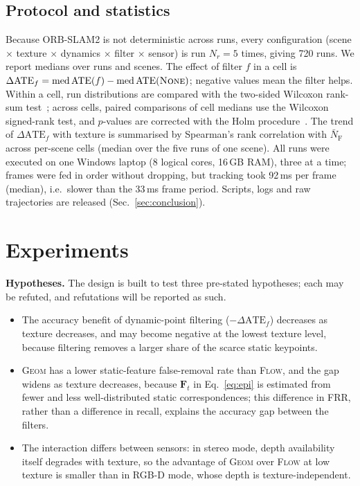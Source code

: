 \documentclass[conference]{IEEEtran}
\newcommand{\none}{\textsc{None}}
\newcommand{\flow}{\textsc{Flow}}
\newcommand{\geom}{\textsc{Geom}}
\newcommand{\hyp}[1]{\textbf{H#1}}
\newcommand{\NFAST}{\bar{N}_{\mathrm{F}}}
\begin{document}
\subsection{Protocol and statistics}
\label{sec:protocol}
Because ORB-SLAM2 is not deterministic across runs, every configuration (scene $\times$ texture $\times$ dynamics $\times$ filter $\times$ sensor) is run $N_r=5$ times, giving 720 runs. We report medians over runs and scenes. The effect of filter $f$ in a cell is $\Delta\mathrm{ATE}_f=\mathrm{med}\,\mathrm{ATE}(f)-\mathrm{med}\,\mathrm{ATE}(\none)$; negative values mean the filter helps. Within a cell, run distributions are compared with the two-sided Wilcoxon rank-sum test~\cite{wilcoxon1945}; across cells, paired comparisons of cell medians use the Wilcoxon signed-rank test, and $p$-values are corrected with the Holm procedure~\cite{holm1979}. The trend of $\Delta\mathrm{ATE}_f$ with texture is summarised by Spearman's rank correlation with $\NFAST$ across per-scene cells (median over the five runs of one scene). All runs were executed on one Windows laptop (8 logical cores, 16\,GB RAM), three at a time; frames were fed in order without dropping, but tracking took 92\,ms per frame (median), i.e.\ slower than the 33\,ms frame period. Scripts, logs and raw trajectories are released (Sec.~\ref{sec:conclusion}).

\section{Experiments}
\label{sec:experiments}

\textbf{Hypotheses.} The design is built to test three pre-stated hypotheses; each may be refuted, and refutations will be reported as such.
\begin{itemize}
\item[\hyp{1}] The accuracy benefit of dynamic-point filtering ($-\Delta\mathrm{ATE}_f$) decreases as texture decreases, and may become negative at the lowest texture level, because filtering removes a larger share of the scarce static keypoints.
\item[\hyp{2}] \geom{} has a lower static-feature false-removal rate than \flow{}, and the gap widens as texture decreases, because $\mathbf{F}_t$ in Eq.~\eqref{eq:epi} is estimated from fewer and less well-distributed static correspondences; this difference in FRR, rather than a difference in recall, explains the accuracy gap between the filters.
\item[\hyp{3}] The interaction differs between sensors: in stereo mode, depth availability itself degrades with texture, so the advantage of \geom{} over \flow{} at low texture is smaller than in RGB-D mode, whose depth is texture-independent.
\end{itemize}
\end{document}
